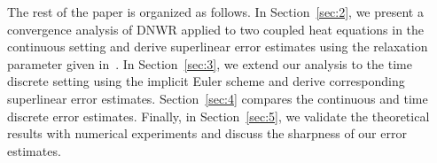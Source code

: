 \documentclass[reqno]{amsart}
\begin{document}
%
%
%

The rest of the paper is organized as follows. In Section~\ref{sec:2}, we present a convergence analysis of DNWR applied to two coupled heat equations in the continuous setting and derive superlinear error estimates using the relaxation parameter given in~\cite{DD28}. In Section~\ref{sec:3}, we extend our analysis to the time discrete setting using the implicit Euler scheme and derive corresponding superlinear error estimates. Section~\ref{sec:4} compares the continuous and time discrete error estimates. Finally, in Section~\ref{sec:5}, we validate the theoretical results with numerical experiments and discuss the sharpness of our error estimates.
\end{document}
